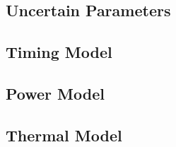 \subsection{Uncertain Parameters} 


\subsection{Timing Model}


\subsection{Power Model}


\subsection{Thermal Model}

